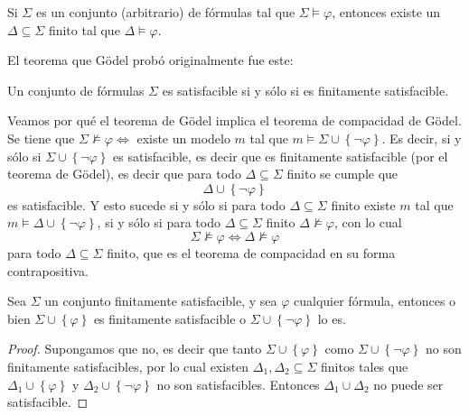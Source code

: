 \documentclass[12pt]{report}
\theoremstyle{largebreak}
\begin{document}
    \begin{theor}
        Si $\Sigma$ es un conjunto (arbitrario) de fórmulas tal que $\Sigma\vDash\varphi$, entonces existe un $\Delta\subseteq\Sigma$ finito tal que $\Delta\vDash\varphi$.
    \end{theor}

    El teorema que Gödel probó originalmente fue este:

    \begin{theor}
        Un conjunto de fórmulas $\Sigma$ es satisfacible si y sólo si es finitamente satisfacible.
    \end{theor}

    Veamos por qué el teorema de Gödel implica el teorema de compacidad de Gödel. Se tiene que $\Sigma\nvDash\varphi\iff$ existe un modelo $m$ tal que $m\vDash\Sigma\cup\left\{\neg\varphi \right\}$. Es decir, si y sólo si $\Sigma\cup\left\{\neg\varphi \right\}$ es satisfacible, es decir que es finitamente satisfacible (por el teorema de Gödel), es decir que para todo $\Delta\subseteq\Sigma$ finito se cumple que
    \begin{equation*}
        \Delta\cup\left\{\neg\varphi \right\}
    \end{equation*}
    es satisfacible. Y esto sucede si y sólo si para todo $\Delta\subseteq\Sigma$ finito existe $m$ tal que $m\vDash\Delta\cup\left\{\neg\varphi \right\}$, si y sólo si para todo $\Delta\subseteq\Sigma$ finito $\Delta\nvDash\varphi$, con lo cual
    \begin{equation*}
        \Sigma\nvDash\varphi\iff\Delta\nvDash\varphi
    \end{equation*}
    para todo $\Delta\subseteq\Sigma$ finito, que es el teorema de compacidad en su forma contrapositiva.

    \begin{lema}
        Sea $\Sigma$ un conjunto finitamente satisfacible, y sea $\varphi$ cualquier fórmula, entonces o bien $\Sigma\cup\left\{\varphi\right\}$ es finitamente satisfacible o $\Sigma\cup\left\{\neg\varphi\right\}$ lo es.
    \end{lema}

    \begin{proof}
        Supongamos que no, es decir que tanto $\Sigma\cup\left\{\varphi\right\}$ como $\Sigma\cup\left\{\neg\varphi\right\}$ no son finitamente satisfacibles, por lo cual existen $\Delta_1,\Delta_2\subseteq\Sigma$ finitos tales que $\Delta_1\cup\left\{\varphi \right\}$ y $\Delta_2\cup\left\{\neg\varphi \right\}$ no son satisfacibles.
        Entonces $\Delta_1\cup\Delta_2$ no puede ser satisfacible.
    \end{proof}
\end{document}
